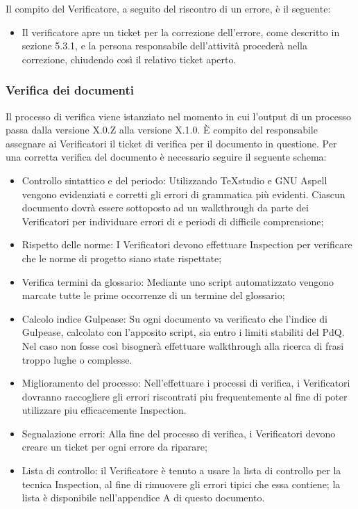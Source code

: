 Il compito del Verificatore, a seguito del riscontro di un errore, è il seguente:
\begin{itemize}
\item {} Il verificatore apre un ticket per la correzione dell'errore, come descritto in sezione 5.3.1, e la persona responsabile dell'attività procederà nella correzione, chiudendo così il relativo ticket aperto.
\end{itemize}

\subsubsection{Verifica dei documenti}
\label{11.1}
Il processo di verifica viene istanziato nel momento in cui l’output di un processo passa
dalla versione X.0.Z alla versione X.1.0. È compito del responsabile assegnare ai Verificatori il ticket di verifica per il documento in questione.
Per una corretta verifica del documento è necessario seguire il seguente schema:
\begin{itemize}
\item Controllo sintattico e del periodo: Utilizzando TeXstudio e GNU Aspell vengono evidenziati e corretti gli errori di grammatica più evidenti. Ciascun documento dovrà essere sottoposto ad un walkthrough da parte dei Verificatori per individuare errori di  e periodi di difficile comprensione;
\item Rispetto delle norme: I Verificatori devono effettuare Inspection per verificare che le norme di progetto siano state rispettate;
\item Verifica termini da glossario: Mediante uno script automatizzato vengono marcate tutte le prime occorrenze di un termine del glossario;
\item Calcolo indice Gulpease: Su ogni documento va verificato che l'indice di Gulpease, calcolato con l'apposito script, sia entro i limiti stabiliti del PdQ. Nel caso non fosse così bisognerà effettuare walkthrough alla ricerca di frasi troppo lughe o complesse.
\item Miglioramento del processo: Nell'effettuare i processi di verifica, i Verificatori dovranno raccogliere gli errori riscontrati piu frequentemente al fine di poter utilizzare piu efficacemente Inspection.
\item Segnalazione errori: Alla fine del processo di verifica, i Verificatori devono creare un ticket per ogni errore da riparare;
\item Lista di controllo: il Verificatore è tenuto a usare la lista di controllo per la tecnica Inspection, al fine di rimuovere gli errori tipici che essa contiene; la lista è disponibile nell'appendice A di questo documento.
\end{itemize}

